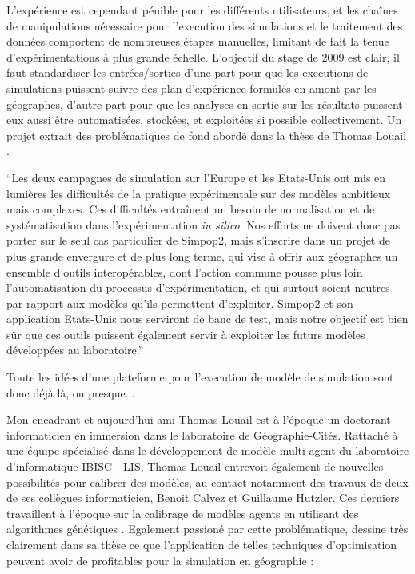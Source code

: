 L'expérience est cependant pénible pour les différents utilisateurs, et les chaînes de manipulations nécessaire pour l'execution des simulations et le traitement des données comportent de nombreuses étapes manuelles, limitant de fait la tenue d'expérimentations à plus grande échelle. L'objectif du stage de 2009 est clair, il faut standardiser les entrées/sorties d'une part pour que les executions de simulations puissent suivre des plan d'expérience formulés en amont par les géographes, d'autre part pour que les analyses en sortie sur les résultats puissent eux aussi être automatisées, stockées, et exploitées si possible collectivement. Un projet extrait des problématiques de fond abordé dans la thèse de Thomas Louail \autocite[132-145]{Louail2010}.

\enquote{Les deux campagnes de simulation sur l’Europe et les Etats-Unis ont mis en lumières les difficultés de la pratique expérimentale sur des modèles ambitieux mais complexes. Ces difficultés entraînent un besoin de normalisation et de systématisation dans l’expérimentation \textit{in silico}. Nos efforts ne doivent donc pas porter sur le seul cas particulier de Simpop2, mais s’inscrire dans un projet de plus grande envergure et de plus long terme, qui vise à offrir aux géographes un ensemble d’outils interopérables, dont l’action commune pousse plus loin l’automatisation du processus d’expérimentation, et qui surtout soient neutres par rapport aux modèles qu’ils permettent d’exploiter. Simpop2 et son application Etats-Unis nous serviront de banc de test, mais notre objectif est bien sûr que ces outils puissent également servir à exploiter les futurs modèles développées au laboratoire.} \autocite[132]{Louail2010}

Toute les idées d'une plateforme pour l'execution de modèle de simulation sont donc déjà là, ou presque...

Mon encadrant et aujourd'hui ami Thomas Louail est à l'époque un doctorant informaticien en immersion dans le laboratoire de Géographie-Cités. Rattaché à une équipe spécialisé dans le développement de modèle multi-agent du laboratoire d'informatique IBISC - LIS, Thomas Louail entrevoit également de nouvelles possibilités pour calibrer des modèles, au contact notamment des travaux de deux de ses collègues informaticien, Benoit Calvez et Guillaume Hutzler. Ces derniers travaillent à l'époque sur la calibrage de modèles agents en utilisant des algorithmes génétiques \autocites{Calvez2005,Calvez2007}. Egalement passioné par cette problématique, \textcite[139-141]{Louail2010} dessine très clairement dans sa thèse ce que l'application de telles techniques d'optimisation peuvent avoir de profitables pour la simulation en géographie :

